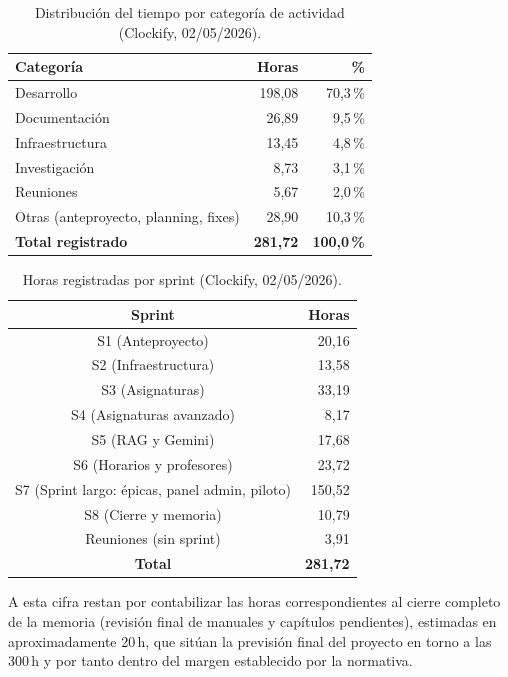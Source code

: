 \begin{table}[hbtp]
\centering
\small
\begin{tabular}{|l|r|r|}
\hline
\textbf{Categoría} & \textbf{Horas} & \textbf{\%} \\ \hline
Desarrollo            & 198,08 & 70,3\,\% \\ \hline
Documentación         &  26,89 &  9,5\,\% \\ \hline
Infraestructura       &  13,45 &  4,8\,\% \\ \hline
Investigación         &   8,73 &  3,1\,\% \\ \hline
Reuniones             &   5,67 &  2,0\,\% \\ \hline
Otras (anteproyecto, planning, fixes) & 28,90 & 10,3\,\% \\ \hline
\textbf{Total registrado} & \textbf{281,72} & \textbf{100,0\,\%} \\ \hline
\end{tabular}
\caption{Distribución del tiempo por categoría de actividad (Clockify, 02/05/2026).}
\label{tab:clockify-categorias}
\end{table}

\begin{table}[hbtp]
\centering
\small
\begin{tabular}{|c|r|}
\hline
\textbf{Sprint} & \textbf{Horas} \\ \hline
S1 (Anteproyecto)        &  20,16 \\ \hline
S2 (Infraestructura)     &  13,58 \\ \hline
S3 (Asignaturas)         &  33,19 \\ \hline
S4 (Asignaturas avanzado)&   8,17 \\ \hline
S5 (RAG y Gemini)        &  17,68 \\ \hline
S6 (Horarios y profesores)& 23,72 \\ \hline
S7 (Sprint largo: épicas, panel admin, piloto) & 150,52 \\ \hline
S8 (Cierre y memoria)    &  10,79 \\ \hline
Reuniones (sin sprint)   &   3,91 \\ \hline
\textbf{Total}           & \textbf{281,72} \\ \hline
\end{tabular}
\caption{Horas registradas por sprint (Clockify, 02/05/2026).}
\label{tab:clockify-sprints}
\end{table}

A esta cifra restan por contabilizar las horas correspondientes al cierre completo de la memoria (revisión final de manuales y capítulos pendientes), estimadas en aproximadamente 20\,h, que sitúan la previsión final del proyecto en torno a las 300\,h y por tanto dentro del margen establecido por la normativa.

